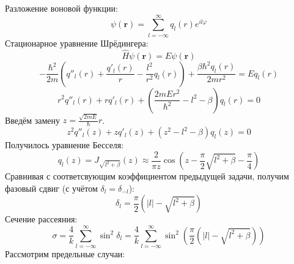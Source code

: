 \documentclass[12pt]{article}
\theoremstyle{definition}
\begin{document}
Разложение воновой функции:
\begin{equation}
    \psi(\textbf{r})=\sum\limits_{l=-\infty}^\infty q_l(r)e^{il\varphi}
\end{equation}
Стационарное уравнение Шрёдингера:
\begin{equation}
    \hat{H}\psi(\textbf{r})=E\psi(\textbf{r})
\end{equation}
\begin{equation}
    -\frac{\hbar^2}{2m}\left(q''_l(r)+\frac{q'_l(r)}{r}-\frac{l^2}{r^2}q_l(r)\right)+\frac{\beta\hbar^2 q_l(r)}{2mr^2}=Eq_l(r)
\end{equation}
\begin{equation}
    r^2q''_l(r)+rq'_l(r)+\left(\frac{2mEr^2}{\hbar^2}-l^2-\beta\right)q_l(r)=0
\end{equation}
Введём замену $z=\frac{\sqrt{2mE}}{\hbar}r$.
\begin{equation}
    z^2q''_l(z)+zq'_l(z)+\left(z^2-l^2-\beta\right)q_l(z)=0
\end{equation}
Получилось уравнение Бесселя:
\begin{equation}
    q_l(z)=J_{\sqrt{l^2+\beta}}(z)\approx\frac{2}{\pi z}\cos\left(z-\frac{\pi}{2}\sqrt{l^2+\beta}-\frac{\pi}{4}\right)
\end{equation}
Сравнивая с соответсвующим коэффициентом предыдущей задачи, получим фазовый сдвиг (с учётом $\delta_l=\delta_{-l}$):
\begin{equation}
    \boxed{\delta_l=\frac{\pi}{2}(|l|-\sqrt{l^2+\beta})}
\end{equation}
Сечение рассеяния:
\begin{equation}
    \boxed{\sigma=\frac{4}{k}\sum\limits_{l=-\infty}^{\infty}\sin^2\delta_l=\frac{4}{k}\sum\limits_{l=-\infty}^{\infty}\sin^2\left(\frac{\pi}{2}(|l|-\sqrt{l^2+\beta})\right)}
\end{equation}
Рассмотрим предельные случаи:
\end{document}
